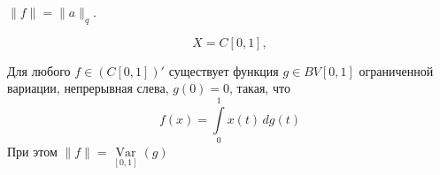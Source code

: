 \documentclass[12pt]{article}
\newtheorem{theorem}{\hskip\parindent Теорема}%
\newtheorem{example}{\hskip\parindent Пример}%
\begin{document}
$\|f\|=\|a\|_q$.
\begin{example}
	\begin{equation*}
		X=C[0,1],
	\end{equation*}
\end{example}
\begin{theorem}[Рисс]
	Для любого $f\in(C[0,1])'$ существует функция $g\in BV[0,1]$ ограниченной вариации, непрерывная слева, $g(0)=0$, такая, что
	\begin{equation*}
		f(x)=\int\limits_{0}^{1}x(t)\,dg(t)
	\end{equation*}
	При этом $\|f\|=\operatorname{Var}\limits_{[0,1]}(g)$
\end{theorem}
\end{document}
